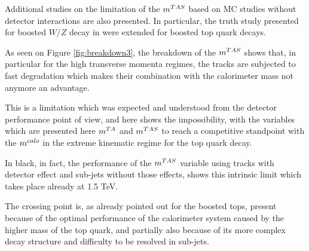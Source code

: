 Additional studies on the limitation of the $m^{TAS}$ based on MC studies without detector interactions are also presented. In particular, the truth study presented for boosted $W/Z$ decay in were extended for boosted top quark decays.

As seen on Figure \ref{fig:breakdown3}, the breakdown of the $m^{TAS}$ shows that, in particular for the high transverse momenta regimes, the tracks are subjected to fast degradation which makes their combination with the calorimeter mass not anymore an advantage. 

This is a limitation which was expected and understood from the detector performance point of view, and here shows the impossibility, with the variables which are presented here $m^{TA}$ and $m^{TAS}$ to reach a competitive standpoint with the $m^{calo}$ in the extreme kinematic regime for the top quark decay.

In black, in fact, the performance of the $m^{TAS}$ variable using tracks with detector effect and sub-jets without those effects, shows this intrinsic limit which takes place already at 1.5 TeV.

The crossing point is, as already pointed out for the boosted tops, present because of the optimal performance of the calorimeter system caused by the higher mass of the top quark, and partially also because of its more complex decay structure and difficulty to be resolved in sub-jets.




% 


